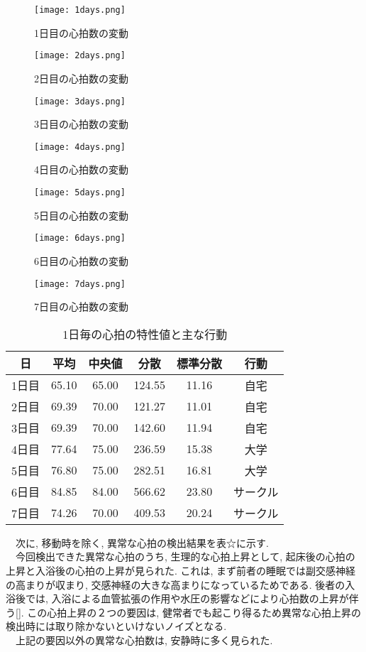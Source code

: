 \documentclass[report, 11pt, a4paper]{jsbook}
\begin{document}
\begin{figure}[H]
\centering
\texttt{[image: 1days.png]}
\caption{1日目の心拍数の変動}
\texttt{[image: 2days.png]}
\caption{2日目の心拍数の変動}
\texttt{[image: 3days.png]}
\caption{3日目の心拍数の変動}
\label{fig:goolge_trends}
\end{figure}

\begin{figure}[H]
\centering
\texttt{[image: 4days.png]}
\caption{4日目の心拍数の変動}
\texttt{[image: 5days.png]}
\caption{5日目の心拍数の変動}
\texttt{[image: 6days.png]}
\caption{6日目の心拍数の変動}
\label{fig:goolge_trends}
\end{figure}

\begin{figure}[H]
\centering
\texttt{[image: 7days.png]}
\caption{7日目の心拍数の変動}
\label{fig:goolge_trends}
\end{figure}

\begin{table}[H]
\centering
\caption{1日毎の心拍の特性値と主な行動}
\begin{tabular}{cccccc}
\hline
日  & 平均    & 中央値   & 分散     & 標準分散  & 行動   \\ \hline
1日目 & 65.10 & 65.00 & 124.55 & 11.16 & 自宅   \\
2日目 & 69.39 & 70.00 & 121.27 & 11.01 & 自宅   \\
3日目 & 69.39 & 70.00 & 142.60 & 11.94 & 自宅   \\
4日目 & 77.64 & 75.00 & 236.59 & 15.38 & 大学   \\
5日目 & 76.80 & 75.00 & 282.51 & 16.81 & 大学   \\
6日目 & 84.85 & 84.00 & 566.62 & 23.80 & サークル \\
7日目 & 74.26 & 70.00 & 409.53 & 20.24 & サークル \\ \hline
\end{tabular}
\end{table}

　次に, 移動時を除く, 異常な心拍の検出結果を表☆に示す. \\
　今回検出できた異常な心拍のうち, 生理的な心拍上昇として, 起床後の心拍の上昇と入浴後の心拍の上昇が見られた. これは, まず前者の睡眠では副交感神経の高まりが収まり, 交感神経の大きな高まりになっているためである. 後者の入浴後では, 入浴による血管拡張の作用や水圧の影響などにより心拍数の上昇が伴う[]. この心拍上昇の２つの要因は, 健常者でも起こり得るため異常な心拍上昇の検出時には取り除かないといけないノイズとなる. \\
　上記の要因以外の異常な心拍数は, 安静時に多く見られた. 
\end{document}
